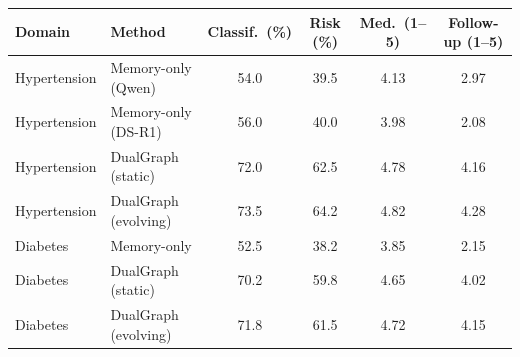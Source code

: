 \begin{tabular}{@{}llcccc@{}}
\toprule
\textbf{Domain} & \textbf{Method}
  & \textbf{Classif.\ (\%)} & \textbf{Risk (\%)}
  & \textbf{Med.\ (1--5)} & \textbf{Follow-up (1--5)} \\
\midrule
Hypertension & Memory-only (Qwen)  & 54.0 & 39.5 & 4.13 & 2.97 \\
Hypertension & Memory-only (DS-R1)  & 56.0 & 40.0 & 3.98 & 2.08 \\
Hypertension & DualGraph (static)  & 72.0 & 62.5 & 4.78 & 4.16 \\
Hypertension & DualGraph (evolving)  & 73.5 & 64.2 & 4.82 & 4.28 \\
\addlinespace
Diabetes & Memory-only  & 52.5 & 38.2 & 3.85 & 2.15 \\
Diabetes & DualGraph (static)  & 70.2 & 59.8 & 4.65 & 4.02 \\
Diabetes & DualGraph (evolving)  & 71.8 & 61.5 & 4.72 & 4.15 \\
\bottomrule
\end{tabular}